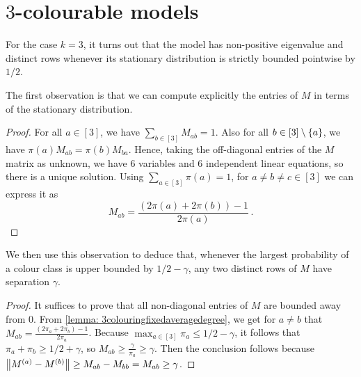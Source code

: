 \section{$3$-colourable models}

For the case $k=3$, it turns out that the model has non-positive eigenvalue and distinct rows whenever its stationary distribution is strictly bounded pointwise by $1/2$. 

The first observation is that we can compute explicitly the entries of $M$ in terms of the stationary distribution.

\begin{proof}
    For all $a \in [3]$, we have $\sum_{b\in [3]}M_{ab}=1$.
    Also for all $b\in [3]\setminus\left\{a\right\}$, we have $\pi(a) M_{ab} = \pi(b) M_{ba}$.
    Hence, taking the off-diagonal entries of the $M$ matrix as unknown, we have $6$ variables and $6$ independent linear equations, so there is a unique solution.
    Using $\sum_{a\in[3]}\pi(a)=1$, for $a\neq b\neq c\in[3]$ we can express it as
    $$M_{ab}= \frac{(2\pi(a)+2\pi(b))-1}{2\pi(a)}\,.$$
\end{proof}

We then use this observation to deduce that, whenever the largest probability of a colour class is upper bounded by $1/2-\gamma$, any two distinct rows of $M$ have separation $\gamma$.

\begin{proof}
It suffices to prove that all non-diagonal entries of $M$ are bounded away from $0$.
From \cref{lemma: 3colouringfixedaveragedegree}, we get for $a \neq b$ that $M_{ab} = \frac{(2\pi_a+2\pi_b)-1}{2\pi_a}$.
Because $\max_{a \in [3]} \pi_a \leq 1/2-\gamma$, it follows that $\pi_a+\pi_b \geq 1/2+\gamma$, so $M_{ab} \geq \frac{\gamma}{\pi_a} \geq \gamma$.
Then the conclusion follows because $\left\lVert M^{(a)} - M^{(b)}\right\rVert \geq M_{ab} - M_{bb} = M_{ab} \geq \gamma$.
\end{proof}


